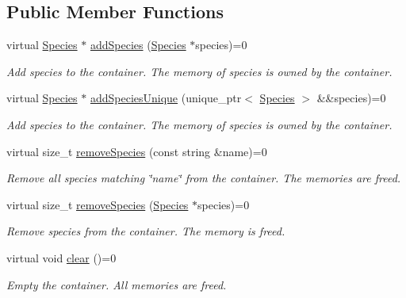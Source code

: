 \subsection*{Public Member Functions}
\begin{DoxyCompactItemize}
\item 
virtual \hyperlink{classSpecies}{Species} $\ast$ \hyperlink{classSpeciesPtrContainerIFace_a24b295940cb32a0c171e3c1b43a95923}{add\+Species} (\hyperlink{classSpecies}{Species} $\ast$species)=0
\begin{DoxyCompactList}\small\item\em Add species to the container. The memory of species is owned by the container. \end{DoxyCompactList}\item 
virtual \hyperlink{classSpecies}{Species} $\ast$ \hyperlink{classSpeciesPtrContainerIFace_a2cb618d807a2b762eedbe98ba4f5c729}{add\+Species\+Unique} (unique\+\_\+ptr$<$ \hyperlink{classSpecies}{Species} $>$ \&\&species)=0
\begin{DoxyCompactList}\small\item\em Add species to the container. The memory of species is owned by the container. \end{DoxyCompactList}\item 
virtual size\+\_\+t \hyperlink{classSpeciesPtrContainerIFace_a251f31bfa76883ae1f1e36eda334b7c4}{remove\+Species} (const string \&name)=0
\begin{DoxyCompactList}\small\item\em Remove all species matching \char`\"{}name\char`\"{} from the container. The memories are freed. \end{DoxyCompactList}\item 
virtual size\+\_\+t \hyperlink{classSpeciesPtrContainerIFace_a5eec3ac264602e649e3f9c04b60802b1}{remove\+Species} (\hyperlink{classSpecies}{Species} $\ast$species)=0
\begin{DoxyCompactList}\small\item\em Remove species from the container. The memory is freed. \end{DoxyCompactList}\item 
virtual void \hyperlink{classSpeciesPtrContainerIFace_a5f39d65d743ac0a49db0be31fa8ac09b}{clear} ()=0
\begin{DoxyCompactList}\small\item\em Empty the container. All memories are freed. \end{DoxyCompactList}\item 

\end{DoxyCompactItemize}
